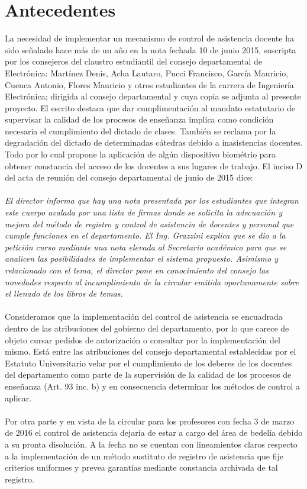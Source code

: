 \documentclass[a4paper, 11pt]{article} %
\begin{document}
\section*{Antecedentes}
La necesidad de implementar un mecanismo de control de asistencia docente ha sido señalado hace más de un año en la nota fechada 10 de junio 2015, suscripta por los consejeros del claustro estudiantil del consejo departamental de Electrónica: Martínez Denis, Acha Lautaro, Pucci Francisco, García Mauricio, Cuenca Antonio, Flores Mauricio y otros estudiantes de la carrera de Ingeniería Electrónica; dirigida al consejo departamental y cuya copia se adjunta al presente proyecto. El escrito destaca que dar cumplimentación al mandato estatutario de supervisar la calidad de los procesos de enseñanza implica como condición necesaria el cumplimiento del dictado de clases. También se reclama por  la degradación del dictado de determinadas cátedras debido a inasistencias docentes. Todo por lo cual propone la aplicación de algún dispositivo biométrio para obtener constancia del acceso de los docentes a sus lugares de trabajo.
El inciso D del acta de reunión del consejo departamental de junio de 2015 dice:\\
\\
\emph{ El director informa que hay una nota presentada por los estudiantes que integran este cuerpo avalada por una lista de firmas donde se solicita la adecuación y mejora del método de registro y control de asistencia de docentes y personal que cumple funciones en el departamento. El Ing. Grazzini explica que se dio a la petición curso mediante una nota elevada al Secretario académico para que se analicen las posibilidades de implementar el sistema propuesto. Asimismo y relacionado con el tema, el director pone en conocimiento del consejo las novedades respecto al incumplimiento de la circular emitida oportunamente sobre el llenado de los libros de temas.}\\
\\
Consideramos que la implementación del control de asistencia se encuadrada dentro de las atribuciones del gobierno del departamento, por lo que carece de objeto cursar pedidos de autorización o consultar por la implementación del mismo. Está entre las atribuciones del consejo departamental establecidas por el Estatuto Universitario velar por el cumplimiento de los deberes de los docentes del departamento como parte de la supervisión de la calidad de los procesos de enseñanza (Art. 93 inc. b) y en consecuencia determinar los métodos de control a aplicar.\\
\\
Por otra parte y en vista de la circular para los profesores con fecha 3 de marzo de 2016 el control de asistencia dejaría de estar a cargo del área de bedelía debido a su pronta disolución. A la fecha  no se cuentan con lineamientos claros respecto a la implementación de un método sustituto de registro de asistencia que fije criterios uniformes y prevea garantías mediante constancia archivada de tal registro.
\end{document}
